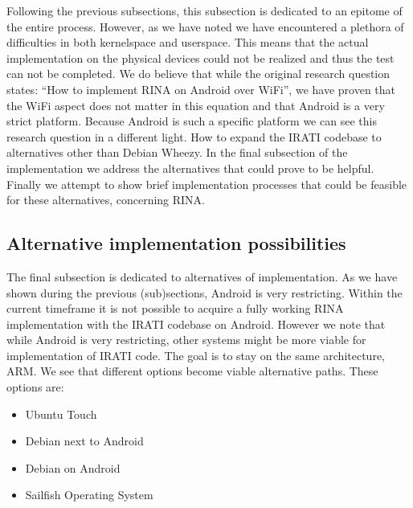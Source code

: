 Following the previous subsections, this subsection is dedicated to an epitome of the entire process. However, as we have noted we have encountered a plethora of difficulties in both kernelspace and userspace. This means that the actual implementation on the physical devices could not be realized and thus the test can not be completed. We do believe that while the original research question states: ``How to implement RINA on Android over WiFi'', we have proven that the WiFi aspect does not matter in this equation and that Android is a very strict platform. 
\npar
Because Android is such a specific platform we can see this research question in a different light. How to expand the IRATI codebase to alternatives other than Debian Wheezy. In the final subsection of the implementation we address the alternatives that could prove to be helpful. Finally we attempt to show brief implementation processes that could be feasible for these alternatives, concerning RINA.

\subsection{Alternative implementation possibilities}

The final subsection is dedicated to alternatives of implementation. As we have shown during the previous (sub)sections, Android is very restricting. Within the current timeframe it is not possible to acquire a fully working RINA implementation with the IRATI codebase on Android. However we note that while Android is very restricting, other systems might be more viable for implementation of IRATI code. The goal is to stay on the same architecture, ARM. We see that different options become viable alternative paths. These options are:

\begin{itemize}
	\item Ubuntu Touch
	\item Debian next to Android
	\item Debian on Android
	\item Sailfish Operating System 
\end{itemize}

\npar

